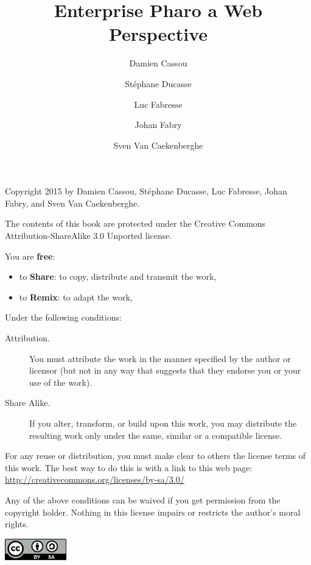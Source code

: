 \documentclass[10pt,twoside,english,showtrims]{support/latex/sbabook/sbabook}
\title{Enterprise Pharo\titlebreak{:} a Web Perspective}
\author{
    Damien Cassou \and
    Stéphane Ducasse \and
    Luc Fabresse \and
    Johan Fabry \and
    Sven Van Caekenberghe}
\date{\gitdate\titlebreak[\smallskip]{ -- }\protect\gitCommitInfo}
\begin{document}
\maketitle
\pagestyle{titlingpage}
\thispagestyle{titlingpage} %

\cleartoverso
{\small

  Copyright 2015 by Damien Cassou, Stéphane Ducasse, Luc Fabresse, Johan Fabry,
  and Sven Van Caekenberghe.

  The contents of this book are protected under the Creative Commons
  Attribution-ShareAlike 3.0 Unported license.

  You are \textbf{free}:
  \begin{itemize}
  \item to \textbf{Share}: to copy, distribute and transmit the work,
  \item to \textbf{Remix}: to adapt the work,
  \end{itemize}

  Under the following conditions:
  \begin{description}
  \item[Attribution.] You must attribute the work in the manner specified by the
    author or licensor (but not in any way that suggests that they endorse you
    or your use of the work).
  \item[Share Alike.] If you alter, transform, or build upon this work, you may
    distribute the resulting work only under the same, similar or a compatible
    license.
  \end{description}

  For any reuse or distribution, you must make clear to others the
  license terms of this work. The best way to do this is with a link to
  this web page: \\
  \url{http://creativecommons.org/licenses/by-sa/3.0/}

  Any of the above conditions can be waived if you get permission from
  the copyright holder. Nothing in this license impairs or restricts the
  author's moral rights.

  \begin{center}
    \includegraphics[width=0.2\textwidth]{support/latex/CreativeCommons-BY-SA.pdf}
  \end{center}

}
\end{document}
